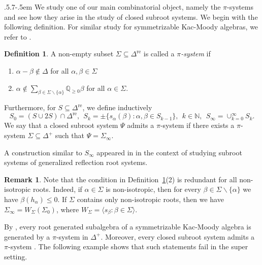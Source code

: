 \documentclass[11pt,reqno]{amsart}
\makeatletter
\theoremstyle{plain}
\theoremstyle{definition}
\newtheorem*{definition}{Definition}
\newtheorem*{rem}{Remark}
\theoremstyle{remark}
\newcommand\bn{\mathbb N}
\numberwithin{equation}{section}
\def\subsection{\def\@secnumfont{\bfseries}\@startsection{subsection}{2}%
  {\parindent}{.5\linespacing\@plus.7\linespacing}{-.5em}%
  {\normalfont\bfseries}}
\makeatother
\begin{document}
\subsection{}\label{secpi} We study one of our main combinatorial object, namely the $\pi$-systems and see how they arise in the study of closed subroot systems. We begin with the following definition. For similar study for symmetrizable Kac-Moody algebras, we refer to \cite{idv2023root}.
\begin{definition}\label{defpi}
    A non-empty subset $\Sigma\subseteq \Delta^{\mathrm{re}}$ is called a \textit{$\pi$-system} if 
    \begin{enumerate}
        \item $\alpha-\beta\notin \Delta$ for all $\alpha,\beta\in \Sigma$
        \item $\alpha\notin \sum_{\beta\in\Sigma\backslash\{\alpha\}} \mathbb{Q}_{\geq 0}\beta$ for all $\alpha\in \Sigma.$
    \end{enumerate}
    Furthermore, for $S\subseteq \Delta^{\mathrm{re}}$, we define inductively 
    $$S_{0}=(S\cup2S)\cap\Delta^{\mathrm{re}},\ \ S_k=\pm\{s_\alpha(\beta):\alpha,\beta\in S_{k-1}\},\ \ k\in \bn,\ \ S_{\infty}=\displaystyle{\cup_{k=0}^\infty} S_k.$$
We say that a closed subroot system $\Psi$ admits a $\pi$-system if there exists a $\pi$-system $\Sigma\subseteq \Delta^{+}$ such that $\Psi=\Sigma_\infty.$
\end{definition}
A construction similar to $S_{\infty}$ appeared in \cite{gorelik17generalized} in the context of studying subroot systems of generalized reflection root systems.
\begin{rem}\label{rempi}
    Note that the condition in Definition~\ref{defpi}(2) is redundant for all non-isotropic roots. Indeed, if $\alpha\in\Sigma$ is non-isotropic, then for every $\beta \in \Sigma \backslash \{\alpha\}$ we have $\beta(h_\alpha) \le 0$. If $\Sigma$ contains only non-isotropic roots, then we have $\Sigma_\infty=W_\Sigma(\Sigma_0)$, where $W_\Sigma=\langle s_{\beta}: \beta \in \Sigma\rangle $.
\end{rem}
By \cite[Theorem 1]{idv2023root}, every root generated subalgebra of a symmetrizable Kac-Moody algebra is generated by a $\pi$-system in $\Delta^{+}$. Moreover, every closed subroot system admits a $\pi$-system \cite[Proposition 3.3]{idv2023root}. The following example shows that such statements fail in the super setting.
\end{document}
